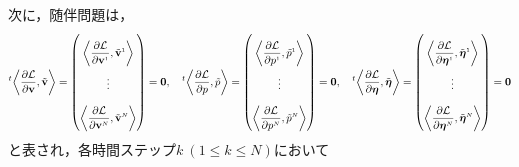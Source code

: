 \documentclass[a4paper,xelatex,ja=standard]{bxjsarticle}
\begin{document}
次に，随伴問題は，
\begin{equation}
    \everymath{\displaystyle}
    \setlength{\arraycolsep}{0.5pt}
    \renewcommand{\arraystretch}{2.5}
    \label{eq:adjoint_problem}
    {}^{t}\!\left\langle\frac{\partial \mathcal{L}}{\partial \mathbf{v}}, \tilde{\mathbf{v}}\right\rangle
    = \begin{pmatrix}
        \left\langle\frac{\partial \mathcal{L}}{\partial \mathbf{v}^{\scriptscriptstyle 1}}, \tilde{\mathbf{v}}^{\scriptscriptstyle 1}\right\rangle \\
        \vdots \\
        \left\langle\frac{\partial \mathcal{L}}{\partial \mathbf{v}^{\scriptscriptstyle N}}, \tilde{\mathbf{v}}^{\scriptscriptstyle N}\right\rangle 
    \end{pmatrix}
    =\mathbf{0}
    ,\quad
    {}^{t}\!\left\langle\frac{\partial \mathcal{L}}{\partial p}, \tilde{p}\right\rangle
    = \begin{pmatrix}
        \left\langle\frac{\partial \mathcal{L}}{\partial p^{\scriptscriptstyle 1}}, \tilde{p}^{\scriptscriptstyle 1}\right\rangle \\
        \vdots \\
        \left\langle\frac{\partial \mathcal{L}}{\partial p^{\scriptscriptstyle N}}, \tilde{p}^{\scriptscriptstyle N}\right\rangle 
    \end{pmatrix}
    =\mathbf{0}
    ,\quad
    {}^{t}\!\left\langle\frac{\partial \mathcal{L}}{\partial \boldsymbol{\eta}}, \tilde{\boldsymbol{\eta}}\right\rangle
    = \begin{pmatrix}
        \left\langle\frac{\partial \mathcal{L}}{\partial \boldsymbol{\eta}^{\scriptscriptstyle 1}}, \tilde{\boldsymbol{\eta}}^{\scriptscriptstyle 1}\right\rangle \\
        \vdots \\
        \left\langle\frac{\partial \mathcal{L}}{\partial \boldsymbol{\eta}^{\scriptscriptstyle N}}, \tilde{\boldsymbol{\eta}}^{\scriptscriptstyle N}\right\rangle 
    \end{pmatrix}
    =\mathbf{0}
\end{equation}
と表され，各時間ステップ$k \ (1 \leq k \leq N)$において
\end{document}
